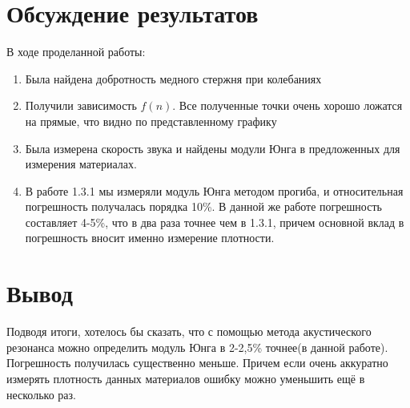 \documentclass[a4, 12pt]{article}
\begin{document}
 \section{Обсуждение результатов}
    В ходе проделанной работы:
    \begin{enumerate}
        \item Была найдена добротность медного стержня при колебаниях
        \item Получили зависимость $f(n)$. Все полученные точки очень хорошо ложатся на прямые, что видно по представленному графику
        \item Была измерена скорость звука и найдены модули Юнга в предложенных для измерения материалах.
        \item В работе 1.3.1 мы измеряли модуль Юнга методом прогиба, и относительная погрешность получалась порядка 10\%. В данной же работе погрешность составляет 4-5\%, что в два раза точнее чем в 1.3.1, причем основной вклад в погрешность вносит именно измерение плотности.
    \end{enumerate}

    \section{Вывод}
    Подводя итоги, хотелось бы сказать, что с помощью метода акустического резонанса можно определить модуль Юнга в 2-2,5\% точнее(в данной работе). Погрешность получилась существенно меньше. Причем если очень аккуратно измерять плотность данных материалов ошибку можно уменьшить ещё в несколько раз.
\end{document}
